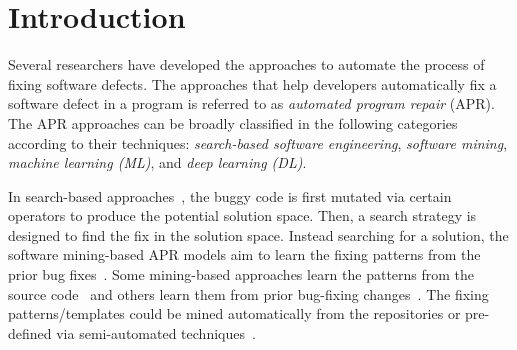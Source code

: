 \section{Introduction}


Several researchers have developed the approaches to automate the
process of fixing software defects. The approaches that help
developers automatically fix a software defect in a program is
referred to as {\em automated program repair} (APR). The APR
approaches can be broadly classified in the following categories
according to their techniques:
{\em search-based software engineering}, {\em software mining}, {\em
  machine learning (ML)}, and {\em deep learning (DL)}.

In search-based
approaches~\cite{LeGoues-icse12,le2011genprog,martinez2016astor,qi2014strength},
the buggy code is first mutated via certain operators to produce the
potential solution space. Then, a search strategy is designed to find
the fix in the solution space. Instead searching for a solution, the
software mining-based APR models aim to learn the fixing patterns from
the prior bug
fixes~\cite{kim2013automatic,le2016history,liu2019avatar,tbar-issta19,nguyen2013semfix,
  icse10,ray-fse12}. Some mining-based approaches learn the patterns
from the source code~\cite{liu2019avatar,tbar-issta19} and others
learn them from prior bug-fixing
changes~\cite{wen2018context,Simfix,koyuncu2018fixminer}.  The fixing
patterns/templates could be mined automatically from the repositories
or pre-defined via semi-automated
techniques~\cite{le2016history,nguyen2013semfix,liu2019avatar,tbar-issta19}.


